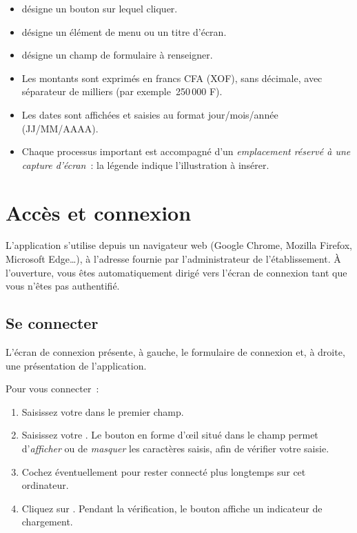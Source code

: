 \begin{itemize}
  \item {} désigne un bouton sur lequel cliquer.
  \item {} désigne un élément de menu ou un titre d'écran.
  \item {} désigne un champ de formulaire à renseigner.
  \item Les montants sont exprimés en francs CFA (XOF), sans décimale, avec séparateur de milliers (par exemple \,250\,000 F\fg{}).
  \item Les dates sont affichées et saisies au format jour/mois/année (JJ/MM/AAAA).
  \item Chaque processus important est accompagné d'un \emph{emplacement réservé à une capture d'écran}~: la légende indique l'illustration à insérer.
\end{itemize}

\section{Accès et connexion}

L'application s'utilise depuis un navigateur web (Google Chrome, Mozilla Firefox, Microsoft Edge\ldots), à l'adresse fournie par l'administrateur de l'établissement. À l'ouverture, vous êtes automatiquement dirigé vers l'écran de connexion tant que vous n'êtes pas authentifié.

\subsection{Se connecter}

L'écran de connexion présente, à gauche, le formulaire de connexion et, à droite, une présentation de l'application.

Pour vous connecter~:

\begin{enumerate}
  \item Saisissez votre  dans le premier champ.
  \item Saisissez votre . Le bouton en forme d'œil situé dans le champ permet d'\emph{afficher} ou de \emph{masquer} les caractères saisis, afin de vérifier votre saisie.
  \item Cochez éventuellement  pour rester connecté plus longtemps sur cet ordinateur.
  \item Cliquez sur . Pendant la vérification, le bouton affiche un indicateur de chargement.
\end{enumerate}

